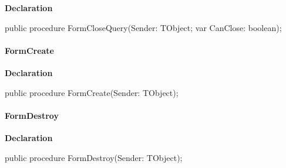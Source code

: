 \documentclass{report}
\newif\ifpdf
\begin{document}
\label{mnupdate.TUMnForm-FormCloseQuery}
\begin{list}{}{
\setlength{\itemindent}{0cm}
\setlength{\listparindent}{0cm}
\setlength{\leftmargin}{\evensidemargin}
\addtolength{\leftmargin}{\tmplength}
\settowidth{\labelsep}{X}
\addtolength{\leftmargin}{\labelsep}
\setlength{\labelwidth}{\tmplength}
}
\item[\textbf{Declaration}\hfill]
\ifpdf
\begin{flushleft}
\fi
\begin{ttfamily}
public procedure FormCloseQuery(Sender: TObject; var CanClose: boolean);\end{ttfamily}

\ifpdf
\end{flushleft}
\fi

\end{list}
\paragraph*{FormCreate}\hspace*{\fill}

\label{mnupdate.TUMnForm-FormCreate}
\begin{list}{}{
\setlength{\itemindent}{0cm}
\setlength{\listparindent}{0cm}
\setlength{\leftmargin}{\evensidemargin}
\addtolength{\leftmargin}{\tmplength}
\settowidth{\labelsep}{X}
\addtolength{\leftmargin}{\labelsep}
\setlength{\labelwidth}{\tmplength}
}
\item[\textbf{Declaration}\hfill]
\ifpdf
\begin{flushleft}
\fi
\begin{ttfamily}
public procedure FormCreate(Sender: TObject);\end{ttfamily}

\ifpdf
\end{flushleft}
\fi

\end{list}
\paragraph*{FormDestroy}\hspace*{\fill}

\label{mnupdate.TUMnForm-FormDestroy}
\begin{list}{}{
\setlength{\itemindent}{0cm}
\setlength{\listparindent}{0cm}
\setlength{\leftmargin}{\evensidemargin}
\addtolength{\leftmargin}{\tmplength}
\settowidth{\labelsep}{X}
\addtolength{\leftmargin}{\labelsep}
\setlength{\labelwidth}{\tmplength}
}
\item[\textbf{Declaration}\hfill]
\ifpdf
\begin{flushleft}
\fi
\begin{ttfamily}
public procedure FormDestroy(Sender: TObject);\end{ttfamily}

\ifpdf
\end{flushleft}
\fi

\end{list}
\end{document}
